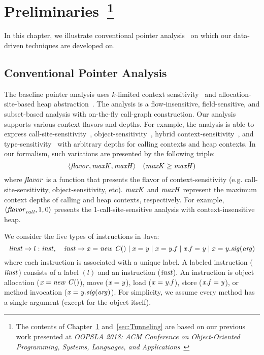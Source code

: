 


\chapter{Preliminaries~\footnote{The contents of Chapter~\ref{sec:Preliminaries} and~\ref{sec:Tunneling} are based on our previous work presented at \emph{OOPSLA 2018: ACM Conference on Object-Oriented Programming, Systems, Languages, and Applications}~\cite{JeJeOh18}}}\label{sec:Preliminaries}
In this chapter, we illustrate conventional pointer analysis~\cite{Smaragdakis2015,KastrinisS13a} on which our data-driven techniques are developed on.



\section{Conventional Pointer Analysis}\label{pre:conventional-analysis}
The baseline pointer analysis uses $k$-limited context sensitivity~\cite{KastrinisS13a,Smaragdakis2011} and allocation-site-based heap abstraction~\cite{Smaragdakis2015,Tan2017}.
The analysis is a flow-insensitive, field-sensitive, and subset-based
analysis with on-the-fly call-graph construction. 
Our analysis supports various context flavors and depths.
For example, the analysis is able to express
call-site-sensitivity~\cite{Shivers1988},
object-sensitivity~\cite{Milanova2005}, hybrid
context-sensitivity~\cite{KastrinisS13a}, and
type-sensitivity~\cite{Smaragdakis2011} with arbitrary depths for
calling contexts and heap contexts. In our formalism, such variations
are presented by the following triple:
\[
  \langle {\it flavor}, {\it maxK}, {\it maxH} \rangle \quad ({\it maxK} \ge {\it maxH})
\]
where ${\it flavor}$ is a function that presents the flavor of
context-sensitivity (e.g. call-site-sensitivity, object-sensitivity,
etc). ${\it maxK}$ and ${\it maxH}$ represent the maximum context depths
of calling and heap contexts, respectively. For example,
$\langle {\it flavor}_{\it call}, 1, 0 \rangle$ presents the 1-call-site-sensitive
analysis with context-insensitive heap. 


We consider the five types of instructions in Java:
\[
  {\it linst} \to l: {\it inst}, \quad {\it inst} \to {\it x = new~C()} \mid {\it x = y}
  \mid {\it x = y.f} \mid {\it x.f = y} \mid {\it x = y.sig(arg)}
\]
where each instruction is associated with a unique label.  A labeled
instruction (${\it linst}$) consists of a label $(l)$ and an instruction
(${\it inst}$). An instruction is object allocation (${\it x = new~C()}$),
move (${\it x = y}$), load (${\it x=y.{\it f}}$), store
(${\it x.{\it f} = y}$), or method invocation (${\it
  x=y.{\it sig}(arg)}$). For simplicity, we assume every method has a
single argument (except for the object itself).

